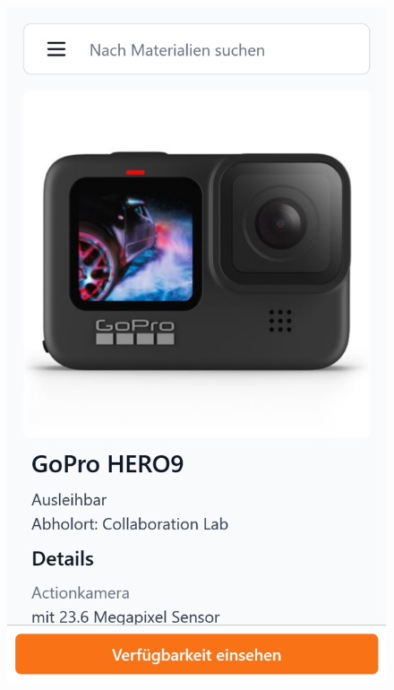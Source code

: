 \begin{figure}[p]
    \includegraphics[scale=0.19]{Bilder/Dialgobeispiel/Details 1.png} 

\end{figure}
